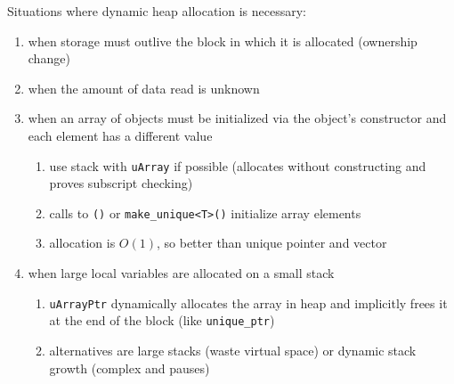 \documentclass[11pt]{article}
\begin{document}
Situations where dynamic heap allocation is necessary:
\begin{enumerate}
\item when storage must outlive the block in which it is allocated (ownership change)
\item when the amount of data read is unknown
\item when an array of objects must be initialized via the object's constructor and each element has a
different value
\begin{enumerate}
\item use stack with \texttt{uArray} if possible (allocates without constructing and proves subscript checking)
\item calls to \texttt{()} or \texttt{make\_unique<T>()} initialize array elements
\item allocation is \(O(1)\), so better than unique pointer and vector
\end{enumerate}
\item when large local variables are allocated on a small stack
\begin{enumerate}
\item \texttt{uArrayPtr} dynamically allocates the array in heap and implicitly frees it at the end of the block
(like \texttt{unique\_ptr})
\item alternatives are large stacks (waste virtual space) or dynamic stack growth (complex and pauses)
\end{enumerate}
\end{enumerate}
\end{document}
